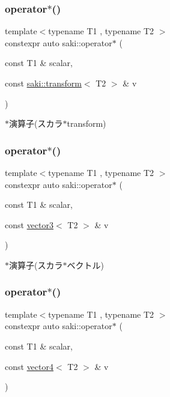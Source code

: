 \subsubsection{\texorpdfstring{operator$\ast$()}{operator*()}\hspace{0.1cm}{\footnotesize\ttfamily [5/14]}}
{\footnotesize\ttfamily template$<$typename T1 , typename T2 $>$ \\
constexpr auto saki\+::operator$\ast$ (\begin{DoxyParamCaption}\item[{const T1 \&}]{scalar,  }\item[{const \mbox{\hyperlink{classsaki_1_1transform}{saki\+::transform}}$<$ T2 $>$ \&}]{v }\end{DoxyParamCaption})}



$\ast$演算子(スカラ$\ast$transform) 

\mbox{\label{namespacesaki_ab3e41594237dcaac47a2a27ed97f48f6}} 
\subsubsection{\texorpdfstring{operator$\ast$()}{operator*()}\hspace{0.1cm}{\footnotesize\ttfamily [6/14]}}
{\footnotesize\ttfamily template$<$typename T1 , typename T2 $>$ \\
constexpr auto saki\+::operator$\ast$ (\begin{DoxyParamCaption}\item[{const T1 \&}]{scalar,  }\item[{const \mbox{\hyperlink{classsaki_1_1vector3}{vector3}}$<$ T2 $>$ \&}]{v }\end{DoxyParamCaption})}



$\ast$演算子(スカラ$\ast$ベクトル) 

\mbox{\label{namespacesaki_ad1caaaf5b1af879f2d546a4b2e10974e}} 
\subsubsection{\texorpdfstring{operator$\ast$()}{operator*()}\hspace{0.1cm}{\footnotesize\ttfamily [7/14]}}
{\footnotesize\ttfamily template$<$typename T1 , typename T2 $>$ \\
constexpr auto saki\+::operator$\ast$ (\begin{DoxyParamCaption}\item[{const T1 \&}]{scalar,  }\item[{const \mbox{\hyperlink{classsaki_1_1vector4}{vector4}}$<$ T2 $>$ \&}]{v }\end{DoxyParamCaption})}



